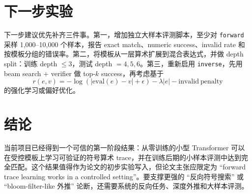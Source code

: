 \documentclass[UTF8,a4paper,11pt]{ctexart}
\begin{document}
\section{下一步实验}

下一步建议优先补齐三件事。第一，增加独立大样本评测脚本，至少对 \texttt{forward} 采样 1,000--10,000 个样本，报告 exact match、numeric success、invalid rate 和按模板分组的错误率。第二，将模板从一层算术扩展到混合表达式，并做 depth split：训练 depth $\leq 3$，测试 depth $=4,5,6$。第三，重新启用 \texttt{inverse}，先用 beam search + verifier 做 top-$k$ success，再考虑基于
\[
  r(e,v)=-\log(|\mathrm{eval}(e)-v|+\epsilon)-\lambda |e|-\mathrm{invalid\ penalty}
\]
的强化学习或偏好优化。

\section{结论}

当前项目已经得到一个可信的第一阶段结果：从零训练的小型 Transformer 可以在受控模板上学习可验证的符号算术 trace，并在训练后期的小样本评测中达到完全匹配。这个结果值得作为论文的初步实验写入，但论文主张应限定为 ``forward trace learning works in a controlled setting''。要支撑更强的 ``反向符号搜索'' 或 ``bloom-filter-like 外推'' 论断，还需要系统的反向任务、深度外推和大样本评测。
\end{document}
